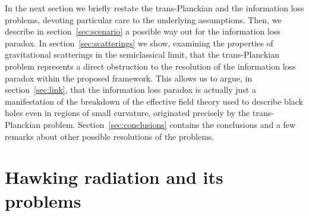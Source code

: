 \documentclass[12pt]{article}
\begin{document}
In the next section we briefly restate the trans-Planckian and the information loss problems, devoting particular care to the underlying assumptions.  Then, we describe in section~\ref{sec:scenario} a possible way out for the information loss paradox.  In section~\ref{sec:scatterings} we show, examining the properties of gravitational scatterings in the semiclassical limit, that the trans-Planckian problem represents a direct obstruction to the resolution of the information loss paradox within the proposed framework.  This allows us to argue, in section~\ref{sec:link}, that the information loss paradox is actually just a manifestation of the breakdown of the effective field theory used to describe black holes even in regions of small curvature, originated precisely by the trans-Planckian problem.  Section~\ref{sec:conclusions} contains the conclusions and a few remarks about other possible resolutions of the problems.

\section{Hawking radiation and its problems}
\label{sec:problems}
\end{document}
